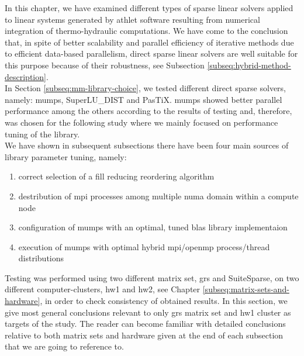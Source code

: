\label{subseq:mm-conclusion}

In this chapter, we have examined different types of sparse linear solvers applied to linear systems generated by \acrshort{athlet} software resulting from numerical integration of thermo-hydraulic computations. We have come to the conclusion that, in spite of better scalability and parallel efficiency of iterative methods due to efficient data-based parallelism, direct sparse linear solvers are well suitable for this purpose because of their robustness, see Subsection \ref{subseq:hybrid-method-description}.\\


In Section \ref{subseq:mm-library-choice}, we tested different direct sparse solvers, namely: \acrshort{mumps},  SuperLU\_DIST and PasTiX. \acrshort{mumps} showed better parallel performance among the others according to  the results of testing and, therefore, was chosen for the following study where we mainly focused on performance tuning of the library.\\


We have shown in subsequent subsections there have been four main sources of library parameter tuning, namely:

\begin{enumerate}
	\item correct selection of a fill reducing reordering algorithm \label{conclusion:mm-1}
	\item destribution of \acrshort{mpi} processes among multiple \acrshort{numa} domain within a compute node \label{conclusion:mm-2}
	\item configuration of \acrshort{mumps} with an optimal, tuned \acrshort{blas} library implementaion \label{conclusion:mm-3}
	\item execution of \acrshort{mumps} with optimal hybrid \acrshort{mpi}/\acrshort{openmp} process/thread distributions \label{conclusion:mm-4}
\end{enumerate}


Testing was performed using two different matrix set, \acrshort{grs} and SuiteSparse, on two different computer-clusters, \gls{hw1} and \gls{hw2}, see Chapter \ref{subseq:matrix-sets-and-hardware}, in order to check consistency of obtained results. In this section, we  give most general conclusions relevant to only \acrshort{grs} matrix set and \gls{hw1} cluster as targets of the study. The reader can become familiar with detailed conclusions relative to both matrix sets and hardware given at the end of each subsection that we are going to reference to.\\



